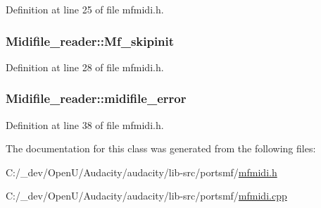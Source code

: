 Definition at line 25 of file mfmidi.\+h.

\subsubsection[{\texorpdfstring{Mf\+\_\+skipinit}{Mf_skipinit}}]{ Midifile\+\_\+reader\+::\+Mf\+\_\+skipinit}\hypertarget{class_midifile__reader_af8cf2aa2d241416adf1d235b12d1c4c7}{}\label{class_midifile__reader_af8cf2aa2d241416adf1d235b12d1c4c7}


Definition at line 28 of file mfmidi.\+h.

\subsubsection[{\texorpdfstring{midifile\+\_\+error}{midifile_error}}]{ Midifile\+\_\+reader\+::midifile\+\_\+error\hspace{0.3cm}{\ttfamily [protected]}}\hypertarget{class_midifile__reader_a255ca952f1c8515f02f43f39bb31b9b6}{}\label{class_midifile__reader_a255ca952f1c8515f02f43f39bb31b9b6}


Definition at line 38 of file mfmidi.\+h.



The documentation for this class was generated from the following files\+:\begin{DoxyCompactItemize}
\item 
C\+:/\+\_\+dev/\+Open\+U/\+Audacity/audacity/lib-\/src/portsmf/\hyperlink{portsmf_2mfmidi_8h}{mfmidi.\+h}\item 
C\+:/\+\_\+dev/\+Open\+U/\+Audacity/audacity/lib-\/src/portsmf/\hyperlink{mfmidi_8cpp}{mfmidi.\+cpp}\end{DoxyCompactItemize}
